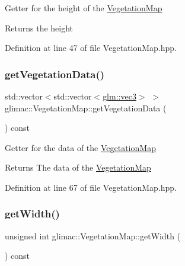 Getter for the height of the \hyperlink{classglimac_1_1_vegetation_map}{Vegetation\+Map} \begin{DoxyReturn}{Returns}
the height 
\end{DoxyReturn}


Definition at line 47 of file Vegetation\+Map.\+hpp.

\mbox{\label{classglimac_1_1_vegetation_map_ac8629079c4237ecccb141c871f1be874}} 
\subsubsection{\texorpdfstring{get\+Vegetation\+Data()}{getVegetationData()}}
{\footnotesize\ttfamily std\+::vector$<$std\+::vector$<$\hyperlink{group__core__types_ga1c47e8b3386109bc992b6c48e91b0be7}{glm\+::vec3}$>$ $>$ glimac\+::\+Vegetation\+Map\+::get\+Vegetation\+Data (\begin{DoxyParamCaption}{ }\end{DoxyParamCaption}) const\hspace{0.3cm}{\ttfamily [inline]}}

Getter for the data of the \hyperlink{classglimac_1_1_vegetation_map}{Vegetation\+Map} \begin{DoxyReturn}{Returns}
The data of the \hyperlink{classglimac_1_1_vegetation_map}{Vegetation\+Map} 
\end{DoxyReturn}


Definition at line 67 of file Vegetation\+Map.\+hpp.

\mbox{\label{classglimac_1_1_vegetation_map_a129e6a0197f0ff9fb0d5d7f8ed6a9b78}} 
\subsubsection{\texorpdfstring{get\+Width()}{getWidth()}}
{\footnotesize\ttfamily unsigned int glimac\+::\+Vegetation\+Map\+::get\+Width (\begin{DoxyParamCaption}{ }\end{DoxyParamCaption}) const\hspace{0.3cm}{\ttfamily [inline]}}


